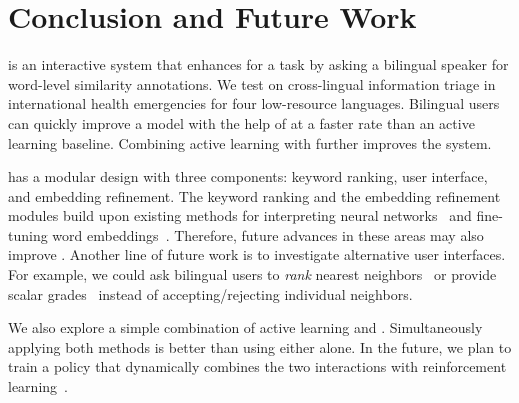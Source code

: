 \section{Conclusion and Future Work}

\name{} is an interactive system that enhances  for a
 task by asking a bilingual speaker for word-level similarity
annotations.
We test \name{} on cross-lingual information triage in international health emergencies for four
low-resource languages.
Bilingual users can quickly improve a model with the help of \name{} at a
faster rate than an active learning baseline.
Combining active learning with \name{} further improves the system.

\name{} has a modular design with three components: keyword ranking, user
interface, and embedding refinement.
The keyword ranking and the embedding refinement modules build upon existing
methods for interpreting neural networks~\citep{li-16} and fine-tuning word
embeddings~\citep{mrksic-17}.
Therefore, future advances in these areas may also improve \name{}.
Another line of future work is to investigate alternative user interfaces.
For example, we could ask bilingual users to \emph{rank} nearest
neighbors~\citep{sakaguchi-18} or provide scalar grades~\citep{hill-15} instead
of accepting/rejecting individual neighbors.

We also explore a simple combination of active learning and
\name{}. Simultaneously applying both methods is better than using either alone.
In the future, we plan to train a policy that dynamically combines the two interactions with reinforcement learning~\citep{fang-17}.
